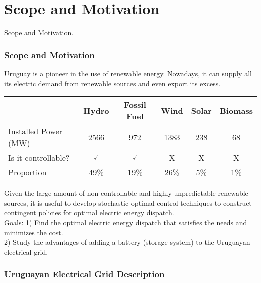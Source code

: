 
\section{Scope and Motivation}
{ 
\begin{frame}[noframenumbering]
\centering
{\Huge Scope and Motivation.}
\end{frame}}


\begin{frame}
\frametitle{Scope and Motivation}
Uruguay is a pioneer in the use of renewable energy. Nowadays, it can supply all its electric demand from renewable sources and even export its excess.
\begin{table}
\begin{tabular}{|l|ccccc|}
 \toprule
 & Hydro & Fossil Fuel & Wind & Solar & Biomass \\
 \midrule
Installed Power (MW) & 2566 & 972 & 1383 & 238 & 68 \\
Is it controllable? & $\checked$ & $\checked$ & X & X & X \\
Proportion & 49\% & 19\% & 26\% & 5\% & 1\% \\
\bottomrule
\end{tabular}
\end{table}
Given the large amount of non-controllable and highly unpredictable renewable sources, it is useful to develop stochastic optimal control techniques to construct contingent policies for optimal electric energy dispatch.\\
{\small\alert{Goals: 1)} Find the optimal electric energy dispatch that satisfies the needs and minimizes the cost.\\
\alert{2)} Study the advantages of adding a battery (storage system) to the Uruguayan electrical grid.}
\end{frame}


\begin{frame}
\frametitle{Uruguayan Electrical Grid Description}
\begin{figure}[ht!]
\centering
{}\quad
{}
\end{figure}
\end{frame}

